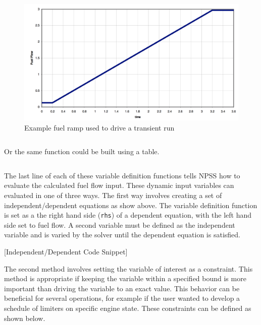 \documentclass[heading.tex]{subfiles}
\begin{document}
\begin{figure}[H]
\centering
\includegraphics[width=1.0\textwidth]{images/fuelRamp}
\caption{Example fuel ramp used to drive a transient run}
\label{f:ramp}
\end{figure}

\begin{adjustwidth}{-1cm}{-1cm}
 \inputminted[]{c++}{code/rampFn}
 \end{adjustwidth} 
 
Or the same function could be built using a table. 
 
 \begin{adjustwidth}{-1cm}{-1cm}
 \inputminted[]{c++}{code/rampTb}
 \end{adjustwidth} 

The last line of each of these variable definition functions tells NPSS how to evaluate the calculated fuel flow input. These dynamic input
variables can evaluated in one of three ways. The first way involves creating a set of independent/dependent equations as show above.
The variable definition function is set as a the right hand side (\texttt{rhs}) of a dependent equation, with the left hand side set to fuel
flow. A second variable must be defined as the independent variable and is varied by the solver until the dependent equation is satisfied.

[Independent/Dependent Code Snippet]

 The second method involves setting the variable of interest as a constraint. This method is appropriate if keeping the variable within a
 specified bound is more important than driving the variable to an exact value. This behavior can be beneficial for several operations, for
 example if the user wanted to develop a schedule of limiters on specific engine state. These constraints can be defined as shown below.
 
\end{document}
